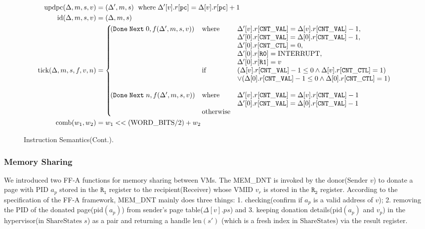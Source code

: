 \documentclass[a4paper]{article}
\newcommand*{\SSS}{\text{ShareStates}}
\newcommand*{\PID}{\text{PID}}
\newcommand*{\VMID}{\text{VMID}}
\newcommand*{\PWBITS}{\text{WORD\_BITS}}
\newcommand*{\updpc}{\text{updpc}}
\begin{document}
\begin{figure}[!h]
  \begin{align*}
    \updpc(\Delta,m,s,v)&=(\Delta',m,s)\ \; \text{where}\; \Delta'[v].r[\mathtt{pc}] = \Delta[v].r[\mathtt{pc}]+1\\
    \text{id}(\Delta,m,s,v)& = (\Delta,m,s)\\
    \nextt(\Delta,m,s,f,v,n)&= \left\{\!\!\!\!\begin{array}{lll}
                                \DNXT{0}{f(\Delta',m,s,v)} &\text{where }&\Delta'[v].r[\mathtt{CNT\_VAL}] = \Delta[v].r[\mathtt{CNT\_VAL}] -1,\\
                                & & \Delta'[0].r[\mathtt{CNT\_VAL}] = \Delta[0].r[\mathtt{CNT\_VAL}] -1,\\
                                & &\Delta'[0].r[\mathtt{CNT\_CTL}] = 0,\\
                                & &\Delta'[0].r[\mathtt{R0}]=\toword{INTERRUPT},\\
                                & &\Delta'[0].r[\mathtt{R1}] = v\\
                                & \text{if}&(\Delta[v].r[\mathtt{CNT\_VAL}] -1 \le 0 \land\Delta[v].r[\mathtt{CNT\_CTL}] = 1)\\
                                & &\lor(\Delta[0].r[\mathtt{CNT\_VAL}] -1 \le 0\land\Delta[0].r[\mathtt{CNT\_CTL}] = 1)\\
                                \\
                                \DNXT{n}{f(\Delta',m,s,v)} &\text{where}&\Delta'[v].r[\mathtt{CNT\_VAL}] = \Delta[v].r[\mathtt{CNT\_VAL}] -1\\
                                & &\Delta'[0].r[\mathtt{CNT\_VAL}] = \Delta[0].r[\mathtt{CNT\_VAL}] -1\\
                                & \text{otherwise}\\
                                              \end{array}  \right.\\
    \text{comb}(w_{1},w_{2})&=w_{1}<<(\PWBITS/2)+w_{2}
  \end{align*}
  \caption{Instruction Semantics(Cont.).}
\end{figure}
\subsubsection{Memory Sharing}
We introduced two FF-A functions for memory sharing between VMs. The MEM\_DNT is
invoked by the donor(Sender $v$) to donate a page with $\PID$ $a_{p}$ stored in
the $\mathtt{R_{1}}$ register to the recipient(Receiver) whose $\VMID$ $v_{r}$
is stored in the $\mathtt{R_{2}}$ register. According to the specification of
the FF-A framework, MEM\_DNT mainly does three things: 1. checking(confirm if
$a_{p}$ is a valid address of $v$); 2. removing the $\PID$ of the donated
page($\text{pid}(a_{p})$) from sender's page table($\Delta[v].ps$) and 3.
keeping donation details($\text{pid}(a_{p})$ and $v_{p}$) in the hypervisor(in
$\SSS$ $s$) as a pair and returning a handle $\text{len}(s')$ (which is a fresh index
in $\SSS$) via the result register.
\end{document}
